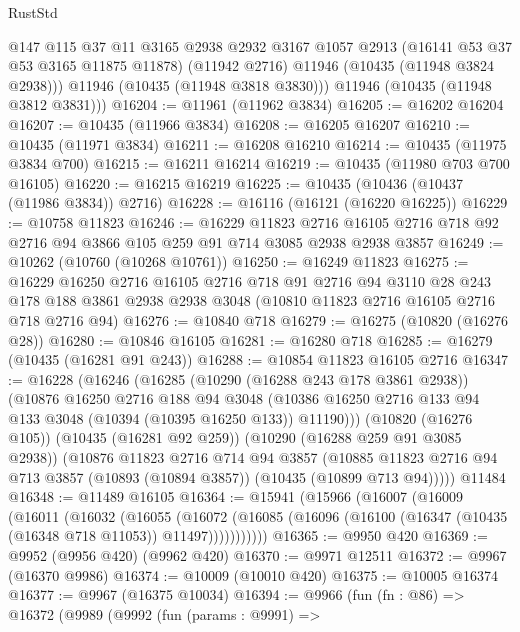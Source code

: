\begin{lexlean}{RustStd}
\begin{coremodule}
{\begin{coremodule}
{{{{{{{{{{{{{{{{{{{{{{{{{{{{{{{{{{{{{{{{{{{{{{{{{{{{{{{{{{{{{{{{{{{{{{{{{{{{{{          @147
          @115
          @37
          @11
          @3165
          @2938
          @2932
          @3167
          @1057
          @2913
          (@16141 @53 @37 @53 @3165 @11875 @11878)
          (@11942 @2716)
          @11946
          (@10435 (@11948 @3824 @2938)))
        @11946
        (@10435 (@11948 @3818 @3830)))
      @11946
      (@10435 (@11948 @3812 @3831)))
@16204 := @11961 (@11962 @3834)
@16205 := @16202 @16204
@16207 := @10435 (@11966 @3834)
@16208 := @16205 @16207
@16210 := @10435 (@11971 @3834)
@16211 := @16208 @16210
@16214 := @10435 (@11975 @3834 @700)
@16215 := @16211 @16214
@16219 := @10435 (@11980 @703 @700 @16105)
@16220 := @16215 @16219
@16225 := @10435 (@10436 (@10437 (@11986 @3834)) @2716)
@16228 := @16116 (@16121 (@16220 @16225))
@16229 := @10758 @11823
@16246 := @16229
    @11823
    @2716
    @16105
    @2716
    @718
    @92
    @2716
    @94
    @3866
    @105
    @259
    @91
    @714
    @3085
    @2938
    @2938
    @3857
@16249 := @10262 (@10760 (@10268 @10761))
@16250 := @16249 @11823
@16275 := @16229
    @16250
    @2716
    @16105
    @2716
    @718
    @91
    @2716
    @94
    @3110
    @28
    @243
    @178
    @188
    @3861
    @2938
    @2938
    @3048
    (@10810 @11823 @2716 @16105 @2716 @718 @2716 @94)
@16276 := @10840 @718
@16279 := @16275 (@10820 (@16276 @28))
@16280 := @10846 @16105
@16281 := @16280 @718
@16285 := @16279 (@10435 (@16281 @91 @243))
@16288 := @10854 @11823 @16105 @2716
@16347 := @16228
    (@16246
      (@16285
        (@10290 (@16288 @243 @178 @3861 @2938))
        (@10876
          @16250
          @2716
          @188
          @94
          @3048
          (@10386 @16250 @2716 @133 @94 @133 @3048 (@10394 (@10395 @16250 @133)) @11190)))
      (@10820 (@16276 @105))
      (@10435 (@16281 @92 @259))
      (@10290 (@16288 @259 @91 @3085 @2938))
      (@10876
        @11823
        @2716
        @714
        @94
        @3857
        (@10885 @11823 @2716 @94 @713 @3857 (@10893 (@10894 @3857)) (@10435 (@10899 @713 @94)))))
    @11484
@16348 := @11489 @16105
@16364 := @15941
    (@15966
      (@16007
        (@16009
          (@16011
            (@16032
              (@16055
                (@16072
                  (@16085 (@16096 (@16100 (@16347 (@10435 (@16348 @718 @11053)) @11497)))))))))))
@16365 := @9950 @420
@16369 := @9952 (@9956 @420) (@9962 @420)
@16370 := @9971 @12511
@16372 := @9967 (@16370 @9986)
@16374 := @10009 (@10010 @420)
@16375 := @10005 @16374
@16377 := @9967 (@16375 @10034)
@16394 := @9966
    (fun (fn : @86) =>
    @16372
      (@9989
        (@9992
          (fun (params : @9991) =>
}}}}}}}}}}}}}}}}}}}}}}}}}}}}}}}}}}}}}}}}}}}}}}}}}}}}}}}}}}}}}}}}}}}}}}}}}}}}}}
\end{coremodule}}
\end{coremodule}
\end{lexlean}
